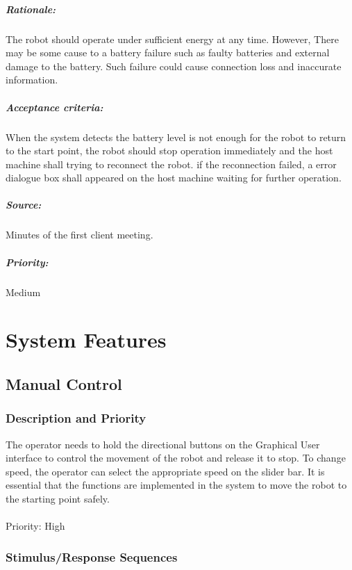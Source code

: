 \documentclass[11pt, a4paper]{report}
\begin{document}
\paragraph{Rationale:}
The robot should operate under sufficient energy at any time. However, There may be some cause to a battery failure such as faulty batteries and external damage to the battery. Such failure could cause connection loss and inaccurate information. 
\paragraph{Acceptance criteria:}
When the system detects the battery level is not enough for the robot to return to the start point, the robot should stop operation immediately and the host machine shall trying to reconnect the robot. if the reconnection failed, a error dialogue box shall appeared on the host machine waiting for further operation.
\paragraph{Source:}
Minutes of the first client meeting.
\paragraph{Priority:}
Medium

		
		   

\pagebreak
\chapter {System Features}
\section {Manual Control}
\subsection {Description and Priority}

The operator needs to hold the directional buttons on the Graphical User interface to control the movement of the robot and release it to stop. To change speed, the operator can select the appropriate speed on the slider bar. It is essential that the functions are implemented in the system to
move the robot to the starting point safely.\\ \\
Priority: High

\subsection {Stimulus/Response Sequences}
\end{document}
